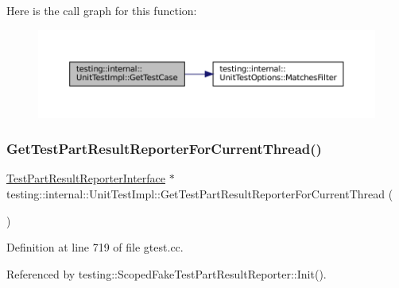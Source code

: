 Here is the call graph for this function\+:
\nopagebreak
\begin{figure}[H]
\begin{center}
\leavevmode
\includegraphics[width=350pt]{classtesting_1_1internal_1_1UnitTestImpl_ac5684d824a59e963cb3274c79d0b6df3_cgraph}
\end{center}
\end{figure}
\mbox{\label{classtesting_1_1internal_1_1UnitTestImpl_a5fb3dd8bc839e10b62eba07790704132}} 
\subsubsection{\texorpdfstring{Get\+Test\+Part\+Result\+Reporter\+For\+Current\+Thread()}{GetTestPartResultReporterForCurrentThread()}}
{\footnotesize\ttfamily \hyperlink{classtesting_1_1TestPartResultReporterInterface}{Test\+Part\+Result\+Reporter\+Interface} $\ast$ testing\+::internal\+::\+Unit\+Test\+Impl\+::\+Get\+Test\+Part\+Result\+Reporter\+For\+Current\+Thread (\begin{DoxyParamCaption}{ }\end{DoxyParamCaption})}



Definition at line 719 of file gtest.\+cc.



Referenced by testing\+::\+Scoped\+Fake\+Test\+Part\+Result\+Reporter\+::\+Init().


